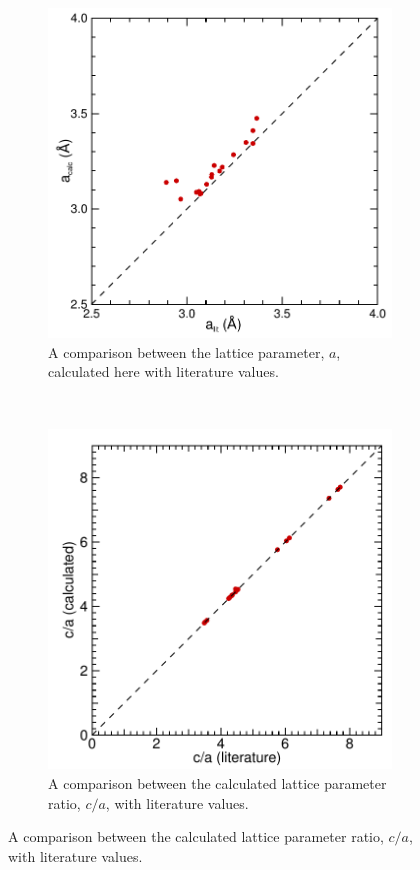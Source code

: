 \begin{figure}
\begin{subfigure}{0.4\textwidth}

\centering
\captionsetup{width=\textwidth}
\includegraphics[width=\textwidth]{a_calc_vs_a_lit}
\caption[Calculated lattice parameters compared with literature values]{A comparison between the lattice parameter, $a$, calculated here with literature values.\label{fig:latt_params_DFT_vs_lit}}

\end{subfigure}
~
\begin{subfigure}{0.4\textwidth}
\centering
\captionsetup{width=\textwidth}
\includegraphics[width=\textwidth]{c-a_calc_vs_lit}
\caption{A comparison between the calculated lattice parameter ratio, $c/a$, with literature values.\label{fig:c_a_ratio_DFT_vs_lit}}
\end{subfigure}


\end{figure}
